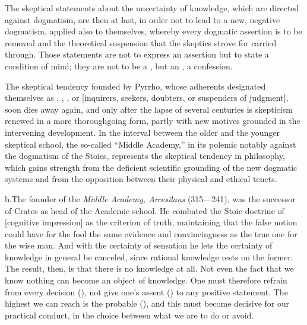 The skeptical statements about the uncertainty of knowledge, which are
directed against dogmatism, are then at last, in order not to lead to a
new, negative dogmatism, applied also to themselves, whereby every
dogmatic assertion is to be removed and the theoretical suspension that
the skeptics strove for carried through. Those statements are not to
express an assertion but to state a condition of mind; they are not to
be a , but an , a confession.

The skeptical tendency founded by Pyrrho, whose adherents designated
themselves as , , , or
 [inquirers, seekers, doubters, or suspenders of
judgment], soon dies away again, and only after the lapse of several
centuries is skepticism renewed in a more thoroughgoing form, partly
with new motives grounded in the intervening development. In the
interval between the older and the younger skeptical school,
the so-called ``Middle Academy,'' in its polemic notably against the
dogmatism of the Stoics, represents the skeptical tendency in
philosophy, which gains strength from the deficient scientific grounding
of the new dogmatic systems and from the opposition between their
physical and ethical tenets.

\divrule

b.\enspace The founder of the \emph{Middle Academy, Arcesilaus}
(315---241), was the successor of Crates as head of the Academic school.
He combated the Stoic doctrine of  [cognitive
impression] as the criterion of truth, maintaining that the false notion
could have for the fool the same evidence and convincingness as the true
one for the wise man. And with the certainty of sensation he lets the
certainty of knowledge in general be canceled, since rational knowledge
rests on the former. The result, then, is that there is no knowledge at
all. Not even the fact that we know nothing can become an object of
knowledge. One must therefore refrain from every decision
(), not give one's assent () to any
positive statement. The highest we can reach is the probable
(), and this must become decisive for our practical
conduct, in the choice between what we are to do or avoid.

